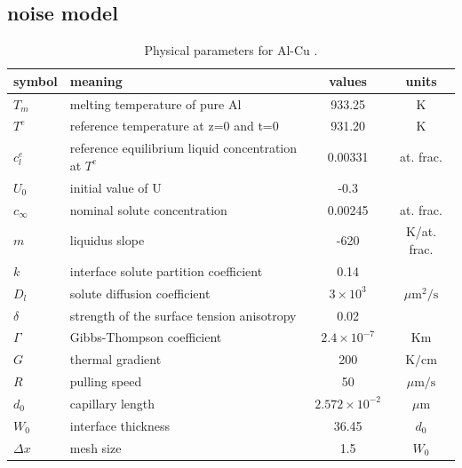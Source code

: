 \documentclass[a4paper,12pt]{article}
\begin{document}
\subsection{noise model}

\begin{table}
\centering
\caption{Physical parameters for Al-Cu \cite{Takaki2014}.}
\begin{tabular}{l l c c }
\toprule
symbol & meaning & values & units \\
\midrule
$T_m$ & melting temperature of pure Al & 933.25  & K \\
$T^e$ & reference temperature at z=0 and t=0 & 931.20  & K \\
$c_l^e$ & reference equilibrium liquid concentration at $T^e$ & 0.00331  & at. frac. \\
$U_0$ & initial value of U & -0.3  &\\
$c_{\infty}$ & nominal solute concentration &  0.00245 & at. frac. \\
$m$ &liquidus slope &  -620 & K/at. frac. \\
$k$ & interface solute partition coefficient & 0.14 &\\
$D_l$ & solute diffusion coefficient &  $3\times 10^{3}$  & ${\mu\text{m}}^2/\text{s}$ \\
$\delta$ & strength of the surface tension anisotropy  &  0.02  &\\
$\Gamma$ & Gibbs-Thompson coefficient & $2.4\times 10^{-7}$ & Km \\
$G$ & thermal gradient & 200 & $\text{K} / \text{cm}$ \\
$R$ & pulling speed &  50 & $\mu \text{m} / \text{s}$ \\
$d_0$ & capillary length & $ 2.572\times10^{-2}$  & $\mu$m \\
$W_0$ & interface thickness  & 36.45 & $d_0$ \\
$\Delta x$ & mesh size & 1.5 & $W_0$ \\
\bottomrule
\end{tabular}\label{tab:Takaki}

\end{table}
\end{document}
